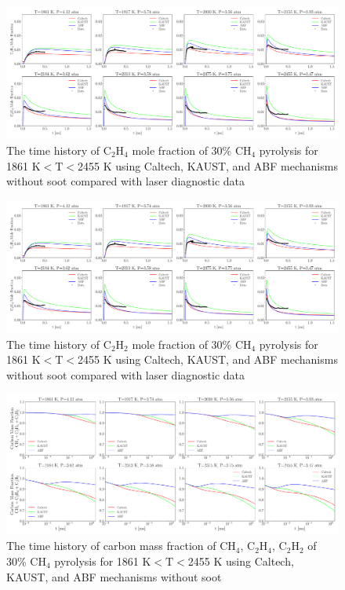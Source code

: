 \begin{figure}[H]
	\centering
	\includegraphics[width=1\textwidth]{Figures/Results/Shocktube/Stanford/june/30CH4_C2H4_mechs_nosoot.pdf}
	\caption{The time history of $\mathrm{C_2H_4}$ mole fraction of 30\% $\mathrm{CH_4}$ pyrolysis for 1861 K$<\mathrm{T}<$2455 K using Caltech, KAUST, and ABF mechanisms without soot compared with laser diagnostic data}
	\label{fig:shocktubest_30ch4_nosoot_c2h4} 
\end{figure}

\begin{figure}[H]
	\centering
	\includegraphics[width=1\textwidth]{Figures/Results/Shocktube/Stanford/june/30CH4_C2H4_mechs_nosoot.pdf}
	\caption{The time history of $\mathrm{C_2H_2}$ mole fraction of 30\% $\mathrm{CH_4}$ pyrolysis for 1861 K$<\mathrm{T}<$2455 K using Caltech, KAUST, and ABF mechanisms without soot compared with laser diagnostic data}
	\label{fig:shocktubest_30ch4_nosoot_c2h2} 
\end{figure}

\begin{figure}[H]
	\centering
	\includegraphics[width=1\textwidth]{Figures/Results/Shocktube/Stanford/june/30CH4_CCC_mechs_nosoot.pdf}
	\caption{The time history of carbon mass fraction of $\mathrm{CH_4}$, $\mathrm{C_2H_4}$, $\mathrm{C_2H_2}$ of 30\% $\mathrm{CH_4}$ pyrolysis for 1861 K$<\mathrm{T}<$2455 K using Caltech, KAUST, and ABF mechanisms without soot}
	\label{fig:shocktubest_30ch4_nosoot_ccc} 
\end{figure}


